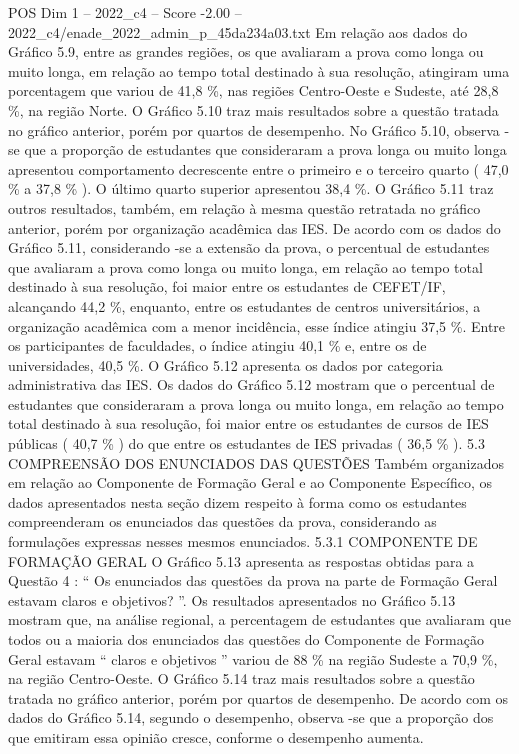 \begin{textsample}{POS Dim 1 – 2022\_c4 – Score -2.00 – 2022\_c4/enade\_2022\_admin\_p\_45da234a03.txt}
Em relação aos dados do Gráfico 5.9, entre as grandes regiões, os que avaliaram a prova como longa ou muito longa, em relação ao tempo total destinado à sua resolução, atingiram uma porcentagem que variou de 41,8 \%, nas regiões Centro-Oeste e Sudeste, até 28,8 \%, na região Norte.
O Gráfico 5.10 traz mais resultados sobre a questão tratada no gráfico anterior, porém por quartos de desempenho.
No Gráfico 5.10, observa -se que a proporção de estudantes que consideraram a prova longa ou muito longa apresentou comportamento decrescente entre o primeiro e o terceiro quarto ( 47,0 \% a 37,8 \% ).
O último quarto superior apresentou 38,4 \%.
O Gráfico 5.11 traz outros resultados, também, em relação à mesma questão retratada no gráfico anterior, porém por organização acadêmica das IES.
De acordo com os dados do Gráfico 5.11, considerando -se a extensão da prova, o percentual de estudantes que avaliaram a prova como longa ou muito longa, em relação ao tempo total destinado à sua resolução, foi maior entre os estudantes de CEFET/IF, alcançando 44,2 \%, enquanto, entre os estudantes de centros universitários, a organização acadêmica com a menor incidência, esse índice atingiu 37,5 \%.
Entre os participantes de faculdades, o índice atingiu 40,1 \% e, entre os de universidades, 40,5 \%.
O Gráfico 5.12 apresenta os dados por categoria administrativa das IES.
Os dados do Gráfico 5.12 mostram que o percentual de estudantes que consideraram a prova longa ou muito longa, em relação ao tempo total destinado à sua resolução, foi maior entre os estudantes de cursos de IES públicas ( 40,7 \% ) do que entre os estudantes de IES privadas ( 36,5 \% ). 5.3 COMPREENSÃO DOS ENUNCIADOS DAS QUESTÕES Também organizados em relação ao Componente de Formação Geral e ao Componente Específico, os dados apresentados nesta seção dizem respeito à forma como os estudantes compreenderam os enunciados das questões da prova, considerando as formulações expressas nesses mesmos enunciados. 5.3.1 COMPONENTE DE FORMAÇÃO GERAL O Gráfico 5.13 apresenta as respostas obtidas para a Questão 4 : “ Os enunciados das questões da prova na parte de Formação Geral estavam claros e objetivos? ”.
Os resultados apresentados no Gráfico 5.13 mostram que, na análise regional, a percentagem de estudantes que avaliaram que todos ou a maioria dos enunciados das questões do Componente de Formação Geral estavam “ claros e objetivos ” variou de 88 \% na região Sudeste a 70,9 \%, na região Centro-Oeste.
O Gráfico 5.14 traz mais resultados sobre a questão tratada no gráfico anterior, porém por quartos de desempenho.
De acordo com os dados do Gráfico 5.14, segundo o desempenho, observa -se que a proporção dos que emitiram essa opinião cresce, conforme o desempenho aumenta.

\end{textsample}
